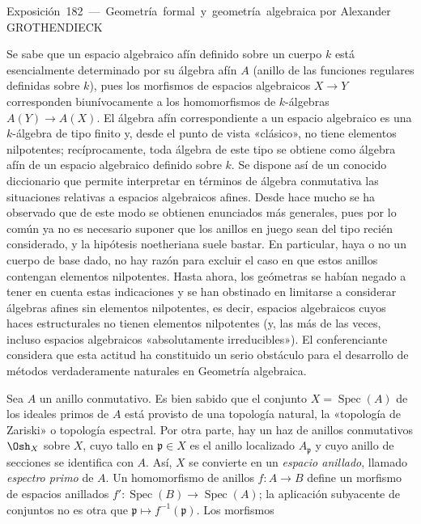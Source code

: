 \unit{Exposición 182 — Geometría formal y geometría algebraica}
%
  {por Alexander GROTHENDIECK}


Se sabe que un espacio algebraico afín definido sobre un cuerpo $k$ está
esencialmente determinado por su álgebra afín $A$ (anillo de las funciones
regulares definidas sobre $k$), pues los morfismos de espacios algebraicos
$X\longrightarrow Y$ corresponden biunívocamente a los homomorfismos de
$k$-álgebras $A(Y)\longrightarrow A(X)$. El álgebra afín correspondiente a un
espacio algebraico es una $k$-álgebra de tipo finito y, desde el punto de vista
«clásico», no tiene elementos nilpotentes; recíprocamente, toda álgebra de este
tipo se obtiene como álgebra afín de un espacio algebraico definido sobre $k$.
Se dispone así de un conocido diccionario que permite interpretar en términos
de álgebra conmutativa las situaciones relativas a espacios algebraicos afines.
Desde hace mucho se ha observado que de este modo se obtienen enunciados más
generales, pues por lo común ya no es necesario suponer que los anillos en juego
sean del tipo recién considerado, y la hipótesis noetheriana suele bastar. En
particular, haya o no un cuerpo de base dado, no hay razón para excluir el caso
en que estos anillos contengan elementos nilpotentes. Hasta ahora, los geómetras
se habían negado a tener en cuenta estas indicaciones y se han obstinado en
limitarse a considerar álgebras afines sin elementos nilpotentes, es decir,
espacios algebraicos cuyos haces estructurales no tienen elementos nilpotentes
(y, las más de las veces, incluso espacios algebraicos «absolutamente
irreducibles»). El conferenciante considera que esta actitud ha constituido un
serio obstáculo para el desarrollo de métodos verdaderamente naturales en
Geometría algebraica.

Sea $A$ un anillo conmutativo. Es bien sabido que el conjunto
$X=\operatorname{Spec}(A)$ de los ideales primos de $A$ está provisto de una
topología natural, la «topología de Zariski» o topología espectral. Por otra
parte, hay un haz de anillos conmutativos $\Osh_X$ sobre $X$, cuyo tallo en
$\mathfrak p\in X$ es el anillo localizado $A_{\mathfrak p}$ y cuyo anillo de
secciones se identifica con $A$. Así, $X$ se convierte en un \emph{espacio
anillado}, llamado \emph{espectro primo} de $A$. Un homomorfismo de anillos
$f:A\longrightarrow B$ define un morfismo de espacios anillados
$f':\operatorname{Spec}(B)\longrightarrow\operatorname{Spec}(A)$; la
aplicación subyacente de conjuntos no es otra que
$\mathfrak p\longmapsto f^{-1}(\mathfrak p)$. Los morfismos

